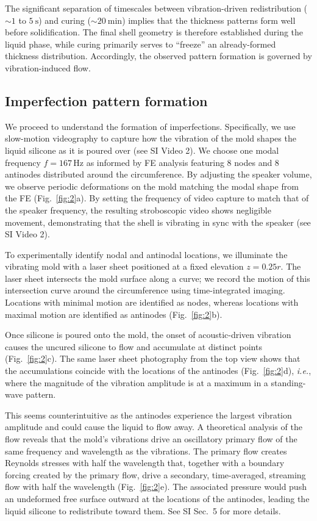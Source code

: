 \documentclass[twocolumn,letter,11pt]{article}
\begin{document}
The significant separation of timescales between vibration-driven redistribution ($\sim 1$ to $\SI{5}{\second}$) and curing ($\sim \SI{20}{\minute}$) implies that the thickness patterns form well before solidification. The final shell geometry is therefore established during the liquid phase, while curing primarily serves to ``freeze'' an already-formed thickness distribution. Accordingly, the observed pattern formation is governed by vibration-induced flow.

\subsection*{Imperfection pattern formation}
We proceed to understand the formation of imperfections. Specifically, we use slow-motion videography to capture how the vibration of the mold shapes the liquid silicone as it is poured over (see SI Video 2). We choose one modal frequency \( f = 167\,\text{Hz} \) as informed by FE analysis featuring 8 nodes and 8 antinodes distributed around the circumference. By adjusting the speaker volume, we observe periodic deformations on the mold matching the modal shape from the FE (Fig.~\ref{fig:2}a). By setting the frequency of video capture to match that of the speaker frequency, the resulting stroboscopic video shows negligible movement, demonstrating that the shell is vibrating in sync with the speaker (see SI Video 2). 

To experimentally identify nodal and antinodal locations, we illuminate the vibrating mold with a laser sheet positioned at a fixed elevation $z=0.25r$. The laser sheet intersects the mold surface along a curve; we record the motion of this intersection curve around the circumference using time-integrated imaging. Locations with minimal motion are identified as nodes, whereas locations with maximal motion are identified as antinodes (Fig.~\ref{fig:2}b).

Once silicone is poured onto the mold, the onset of acoustic-driven vibration causes the uncured silicone to flow and accumulate at distinct points (Fig.~\ref{fig:2}c). The same laser sheet photography from the top view shows that the accumulations coincide with the locations of the antinodes (Fig.~\ref{fig:2}d), \textit{i.e.}, where the magnitude of the vibration amplitude is at a maximum in a standing-wave pattern.

This seems counterintuitive as the antinodes experience the largest vibration amplitude and could cause the liquid to flow away. 
A theoretical analysis of the flow reveals that the mold's vibrations drive an oscillatory primary flow of the same frequency and wavelength as the vibrations. The primary flow creates Reynolds stresses with half the wavelength that, together with a boundary forcing created by the primary flow, drive a secondary, time-averaged, streaming flow with half the wavelength (Fig.~\ref{fig:2}e). The associated pressure would push an undeformed free surface outward at the locations of the antinodes, leading the liquid silicone to redistribute toward them. See SI Sec.~5 for more details.
\end{document}
